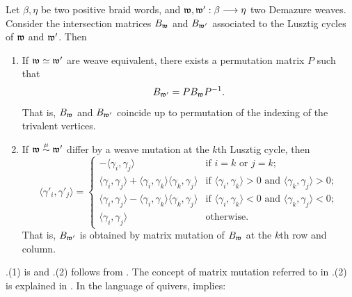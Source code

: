 \begin{proposition}\label{prop:intersection_Lusztig_cycles_weave_operations}
Let $\beta,\eta$ be two positive braid words, and $\mathfrak{w},\mathfrak{w}':\beta\longrightarrow\eta$ two Demazure weaves. Consider the intersection matrices $B_{\mathfrak{w}}$ and $B_{\mathfrak{w}'}$ associated to the Lusztig cycles of $\mathfrak{w}$ and $\mathfrak{w}'$. Then

\begin{enumerate}
    \item If $\mathfrak{w}\simeq\mathfrak{w}'$ are weave equivalent, there exists a permutation matrix $P$ such that
    \begin{equation}
        B_{\mathfrak{w}'}=PB_{\mathfrak{w}}P^{-1}.
    \end{equation}
    That is, $B_{\mathfrak{w}}$ and $B_{\mathfrak{w}'}$ coincide up to permutation of the indexing of the trivalent vertices.\\

    \item If $\mathfrak{w}\stackrel{\mu}{\sim}\mathfrak{w}'$ differ by a weave mutation at the $k$th Lusztig cycle, then
\begin{equation}
\langle \gamma'_i,\gamma'_j\rangle =
\begin{cases}
-\langle \gamma_i,\gamma_j\rangle & \text{if } i=k \text{ or } j=k; \\
\langle \gamma_i,\gamma_j\rangle + \langle \gamma_i,\gamma_k\rangle \langle \gamma_k,\gamma_j\rangle & \text{if } \langle \gamma_i,\gamma_k\rangle > 0 \text{ and } \langle \gamma_k,\gamma_j\rangle > 0; \\
\langle \gamma_i,\gamma_j\rangle - \langle \gamma_i,\gamma_k\rangle \langle \gamma_k,\gamma_j\rangle & \text{if } \langle \gamma_i,\gamma_k\rangle < 0 \text{ and } \langle \gamma_k,\gamma_j\rangle < 0; \\
\langle \gamma_i,\gamma_j\rangle & \text{otherwise.}
\end{cases}
\end{equation}
That is, $B_{\mathfrak{w}'}$ is obtained by matrix mutation of $B_{\mathfrak{w}}$ at the $k$th row and column.
\end{enumerate}
\end{proposition}

\noindent {}.(1) is \cite[Corollary 4.31]{CGGLSS25} and .(2) follows from \cite[Lemma 4.33]{CGGLSS25}. The concept of matrix mutation referred to in .(2) is explained in \cite[Lemma 2.7.3]{FWZ16}. In the language of quivers,  implies:

